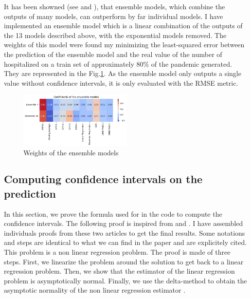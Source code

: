 It has been showned (see \cite{cramer2022evaluation} and \cite{reich2019accuracy}), that ensemble models, which combine the outputs of many models, can outperform by far individual models.
I have implemented an ensemble model which is a linear combination of the outputs of the 13 models described above, with the exponential models removed.
The weights of this model were found my minimizing the least-squared error between the prediction of the ensemble model and the real value of the number of hospitalized on a train set of approximately 80\% of the pandemic generated. 
They are represented in the Fig.\ref{fig:ensemble_weights}.
As the ensemble model only outputs a single value without confidence intervals, it is only evaluated with the RMSE metric. 
\begin{figure}
    \centering
    \includegraphics[width=0.5\textwidth]{figures/esb_coefs.png}
    \caption{Weights of the ensemble models}
    \label{fig:ensemble_weights}
\end{figure}
\subsection{Computing confidence intervals on the prediction}
\label{sec:ci}
In this section, we prove the formula used for in the code to compute the confidence intervals. 
The following proof is inspired from \cite{ruckstuhl2010introduction} and \cite{powellasymptoticsforleastsquares}. 
I have assembled individuals proofs from these two articles to get the final results. 
Some notations and steps are identical to what we can find in the paper and are explicitely cited. 
This problem is a non linear regression problem. 
The proof is made of three steps. 
First, we linearize the problem around the solution to get back to a linear regression problem. 
Then, we show that the estimator of the linear regression problem is asymptotically normal.
Finally, we use the delta-method to obtain the asymptotic normality of the non linear regression estimator . \\



